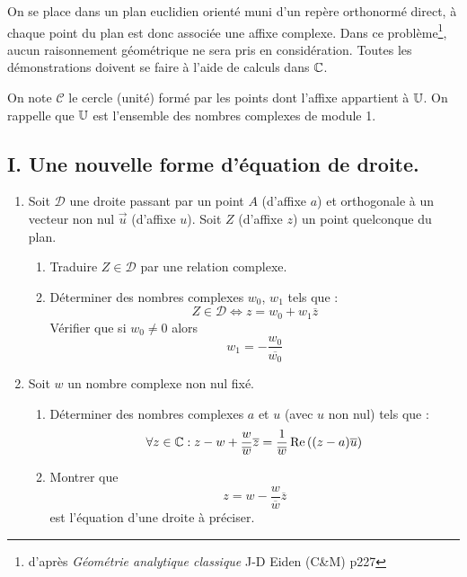 On se place dans un plan euclidien orienté muni d'un repère orthonormé direct, à chaque point du plan est donc associée une affixe complexe.\newline
Dans ce problème\footnote{d'après \emph{Géométrie analytique classique} J-D Eiden (C\&M) p227}, aucun raisonnement géométrique ne sera pris en considération. Toutes les démonstrations doivent se faire à l'aide de calculs dans $\mathbb{C}$.

On note $\mathcal C$ le cercle (unité) formé par les points dont l'affixe appartient à $\mathbb{U}$. On rappelle que $\mathbb{U}$ est l'ensemble des nombres complexes de module 1.
\subsection*{I. Une nouvelle forme d'équation de droite.}
\begin{enumerate}
 \item Soit $\mathcal D$ une droite passant par un point $A$ (d'affixe  $a$) et orthogonale à un vecteur non nul $\overrightarrow u$ (d'affixe $u$). Soit $Z$ (d'affixe $z$) un point quelconque du plan.
 \begin{enumerate}
   \item Traduire $Z\in \mathcal D$ par une relation complexe.
   \item Déterminer des nombres complexes $w_0$, $w_1$ tels que :
\begin{displaymath}
 Z\in \mathcal D \Leftrightarrow z = w_0 + w_1 \overline{z}
\end{displaymath}
 Vérifier que si $w_0\neq 0$ alors
\begin{displaymath}
w_1 = - \frac{w_0}{\overline{w_0}} 
\end{displaymath}
 \end{enumerate}
 
 \item Soit $w$ un nombre complexe non nul fixé.
\begin{enumerate}
 \item Déterminer des nombres complexes $a$ et $u$ (avec $u$ non nul) tels que :
\begin{displaymath}
 \forall z \in \mathbb{C} : 
z - w + \frac{w}{\overline{w}}\overline{z}= \frac{1}{\overline{w}}\operatorname{Re}\left( (z-a)\overline{u}\right) 
\end{displaymath}
 
 \item Montrer que
\begin{displaymath}
 z = w - \frac{w}{\overline{w}}\overline{z}
\end{displaymath}
est l'équation d'une droite à préciser.
\end{enumerate}
\end{enumerate}

